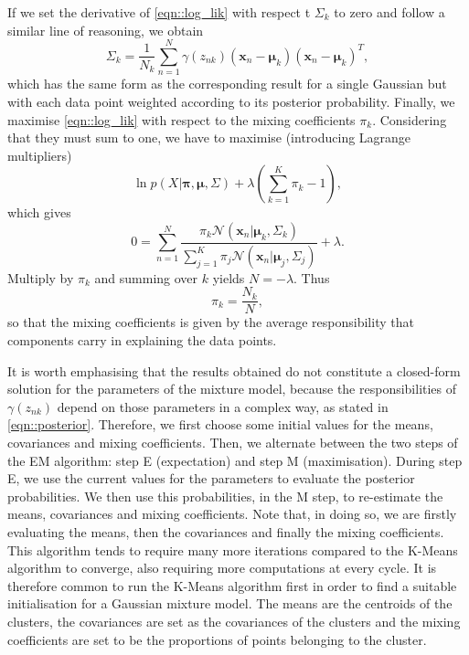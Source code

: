 \documentclass[a4paper]{article}
\begin{document}
 	If we set the derivative of \eqref{eqn::log_lik} with respect t $\Sigma_{k}$ to zero and follow a similar line of reasoning, we obtain
 	\begin{equation*}
 	\Sigma_{k} = \frac{1}{N_{k}} \sum_{n=1}^{N} \gamma \left( z_{nk} \right) \left( \boldsymbol{x}_{n} - \boldsymbol{\mu}_{k} \right) \left( \boldsymbol{x}_{n} - \boldsymbol{\mu}_{k} \right)^{T},
 	\end{equation*}
 	which has the same form as the corresponding result for a single Gaussian but with each data point weighted according to its posterior probability.
 	Finally, we maximise \eqref{eqn::log_lik} with respect to the mixing coefficients $\pi_{k}$. Considering that they must sum to one, we have to maximise (introducing Lagrange multipliers)
 	\begin{equation*}
 	\ln p \left( X | \boldsymbol{\pi}, \boldsymbol{\mu}, \Sigma  \right) +
 	\lambda \left( \sum_{k=1}^{K} \pi_{k} - 1 \right),
 	\end{equation*}
 	which gives
 	\begin{equation*}
 	0 = \sum_{n=1}^{N} \frac{ \pi_{k}  \mathcal{N} \left( \boldsymbol{x}_{n} | \boldsymbol{\mu}_{k}, \Sigma_{k} \right)}{\sum_{j=1}^{K} \pi_{j} \mathcal{N} \left( \boldsymbol{x}_{n} | \boldsymbol{\mu}_{j}, \Sigma_{j} \right)} + \lambda.
 	\end{equation*}
 	Multiply by $\pi_{k}$ and summing over $k$ yields $N = - \lambda$. Thus
 	\begin{equation*}
 	\pi_{k} = \frac{N_{k}}{N},
 	\end{equation*}
 	so that the mixing coefficients is given by the average responsibility that components carry in explaining the data points.

 	It is worth emphasising that the results obtained do not constitute a closed-form solution for the parameters of the mixture model, because the responsibilities of $\gamma \left( z_{nk} \right)$ depend on those parameters in a complex way, as stated in \eqref{eqn::posterior}.
 	Therefore, we first choose some initial values for the means, covariances and mixing coefficients. Then, we alternate between the two steps of the EM algorithm: step E (expectation) and step M (maximisation).
 	During step E, we use the current values for the parameters to evaluate the posterior probabilities. We then use this probabilities, in the M step, to re-estimate the means, covariances and mixing coefficients.
 	Note that, in doing so, we are firstly evaluating the means, then the covariances and finally the mixing coefficients.
 	This algorithm tends to require many more iterations compared to the K-Means algorithm to converge, also requiring more computations at every cycle. It is therefore common to run the K-Means algorithm first in order to find a suitable initialisation for a Gaussian mixture model.
 	The means are the centroids of the clusters, the covariances are set as the covariances of the clusters and the mixing coefficients are set to be the proportions of points belonging to the cluster.
	
	
\end{document}
